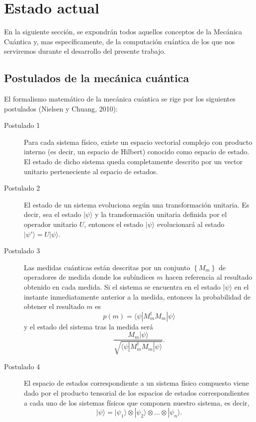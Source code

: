 \section{Estado actual}

En la siguiente sección, se expondrán todos aquellos conceptos de la Mecánica Cuántica y, mas específicamente, de la computación cuántica de los que nos serviremos durante el desarrollo del presente trabajo.

\subsection{Postulados de la mecánica cuántica}

El formalismo matemático de la mecánica cuántica se rige por los siguientes postulados (Nielsen y Chuang, 2010):

\begin{description}
    \item[Postulado 1] Para cada sistema físico, existe un espacio vectorial complejo con producto interno (es decir, un espacio de Hilbert) conocido como espacio de estado. El estado de dicho sistema queda completamente descrito por un vector unitario perteneciente al espacio de estados. 
    
    \item[Postulado 2] El estado de un sistema evoluciona según una transformación unitaria. Es decir, sea el estado $ | \psi \rangle$ y la transformación unitaria definida por el operador unitario $U$, entonces el estado $ | \psi \rangle $ evolucionará al estado $ | \psi' \rangle = U | \psi \rangle$.
    \item[Postulado 3] Las medidas cuánticas están descritas por un conjunto $ \left \{ M_m \right \}  $ de operadores de medida donde los subíndices $m$ hacen referencia al resultado obtenido en cada medida. Si el sistema se encuentra en el estado $ | \psi \rangle $ en el instante inmediatamente anterior a la medida, entonces la probabilidad de obtener el resultado $m$ es $$ p(m)= \langle \psi | M_m^\dagger M_m | \psi \rangle $$ y el estado del sistema tras la medida será $$ \frac{M_m | \psi \rangle}{\sqrt{\langle \psi | M_m^\dagger M_m | \psi \rangle}} . $$
    \item[Postulado 4] El espacio de estados correspondiente a un sistema físico compuesto viene dado por el producto tensorial de los espacios de estados correspondientes a cada uno de los sistemas físicos que componen nuestro sistema, es decir, $$| \psi \rangle = | \psi_1 \rangle \otimes | \psi_2 \rangle \otimes ... \otimes | \psi_n \rangle .$$
\end{description}

